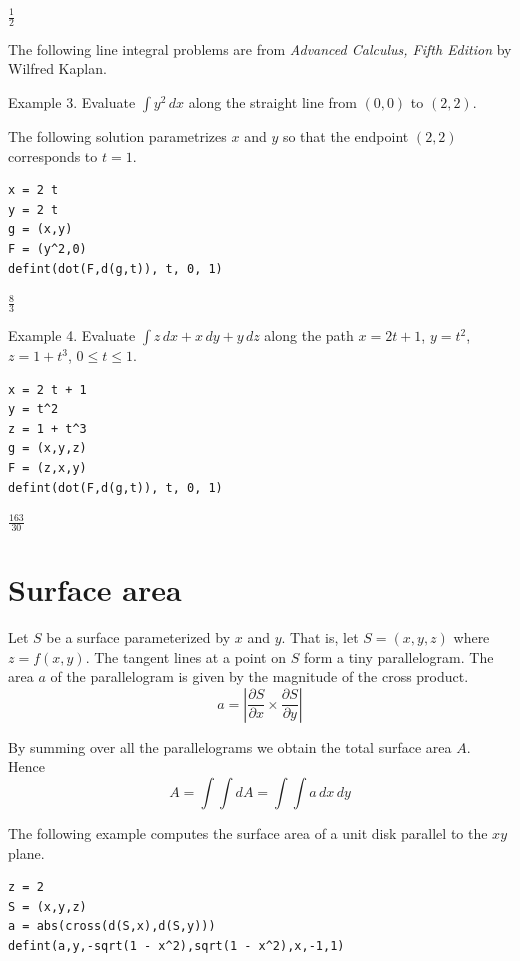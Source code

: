 \documentclass[12pt]{article}
\begin{document}
$\displaystyle \tfrac{1}{2}$

\bigskip
The following line integral problems are from
{\it Advanced Calculus, Fifth Edition} by Wilfred Kaplan.

\bigskip
Example 3. Evaluate $\int y^2\,dx$ along the straight
line from $(0,0)$ to $(2,2)$.

\bigskip
The following solution parametrizes $x$ and $y$ so that
the endpoint $(2,2)$ corresponds to $t=1$.

{\color{blue}
\begin{verbatim}
x = 2 t
y = 2 t
g = (x,y)
F = (y^2,0)
defint(dot(F,d(g,t)), t, 0, 1)
\end{verbatim}}

$\displaystyle \tfrac{8}{3}$

\bigskip
Example 4. Evaluate $\int z\,dx+x\,dy+y\,dz$
along the path
$x=2t+1$, $y=t^2$, $z=1+t^3$, $0\le t\le 1$.

{\color{blue}
\begin{verbatim}
x = 2 t + 1
y = t^2
z = 1 + t^3
g = (x,y,z)
F = (z,x,y)
defint(dot(F,d(g,t)), t, 0, 1)
\end{verbatim}}

$\displaystyle \tfrac{163}{30}$

\newpage

\section{Surface area}

Let $S$ be a surface parameterized by $x$ and $y$.
That is, let $S=(x,y,z)$ where $z=f(x,y)$.
The tangent lines at a point on $S$ form a tiny parallelogram.
The area $a$ of the parallelogram is given by the magnitude of the cross product.
\begin{equation*}
a=\left|\frac{\partial S}{\partial x}\times\frac{\partial S}{\partial y}\right|
\end{equation*}

By summing over all the parallelograms we obtain the total surface area $A$.
Hence
\begin{equation*}
A=\int\int dA=\int\int a\,dx\,dy
\end{equation*}

The following example computes the surface area of a unit disk
parallel to the $xy$ plane.

{\color{blue}
\begin{verbatim}
z = 2
S = (x,y,z)
a = abs(cross(d(S,x),d(S,y)))
defint(a,y,-sqrt(1 - x^2),sqrt(1 - x^2),x,-1,1)
\end{verbatim}
}
\end{document}
